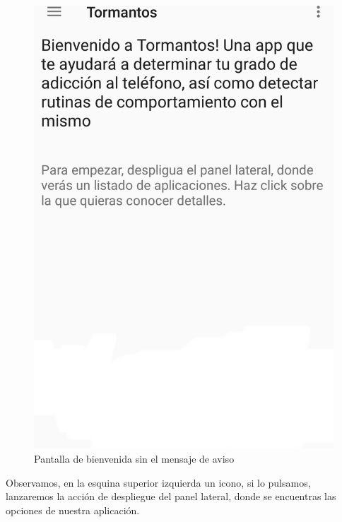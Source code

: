\documentclass[12pt,a4paper,oneside]{book} %
\begin{document}
\begin{figure}[H]
	\begin{center}
     	\includegraphics[scale=0.2]{pictures/capsapp/home2.png}
	    	\caption{Pantalla de bienvenida sin el mensaje de aviso}
    	\label{fig:Pantalla de bienvenida sin el mensaje de aviso}
	\end{center}
\end{figure}
Observamos, en la esquina superior izquierda un icono, si lo pulsamos, lanzaremos la acción de despliegue del panel lateral, donde se encuentras las opciones de nuestra aplicación. 
\end{document}

